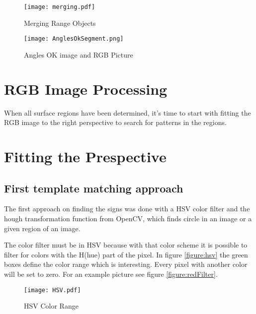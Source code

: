 \begin{figure}[H]
\begin{center}
  \texttt{[image: merging.pdf]}
  \caption{Merging Range Objects}
  \label{figure:Merging}
\end{center}
\end{figure}

\begin{figure}[H]
\begin{center}
  \texttt{[image: AnglesOkSegment.png]}
  \caption[Angles OK Image and RGB Picture]{Angles OK image and RGB Picture\footnotemark}
  \label{figure:AnglesOKSeg}
\end{center}
\end{figure}
\newpage

\section{RGB Image Processing}

When all surface regions have been determined, it's time to start with fitting the RGB image 
to the right perspective to search for patterns in the regions. 


\section{Fitting the Prespective}




\subsection{First template matching approach}
The first approach on finding the signs was done with a HSV color filter and the hough transformation
function from OpenCV, which finds circle in an image or a given region of an image.

The color filter must be in HSV because with that color scheme it is possible to filter for colors
with the H(hue) part of the pixel. In figure \vref{figure:hsv} the green boxes define the color range
which is interesting. Every pixel with another color will be set to zero. For an example picture see 
figure \vref{figure:redFilter}.

\begin{figure}[H]
\begin{center}
  \texttt{[image: HSV.pdf]}
  \caption{HSV Color Range}
  \label{figure:hsv}
\end{center}
\end{figure}


